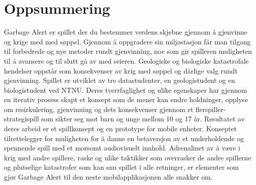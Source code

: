 \section{Oppsummering}
Garbage Alert er spillet der du bestemmer verdens skjebne gjennom å gjenvinne og krige med med søppel. Gjennom å oppgradere sin miljøstasjon får man tilgang til forbedrede og nye metoder rundt gjenvinning, noe som gir spilleren muligheten til å avansere og til slutt gå av med seieren.  Geologiske og biologiske katastrofale hendelser oppstår som konsekvenser av krig med søppel og dårlige valg rundt gjenvinning. 
Spillet er utviklet av tre datastudenter, en geologistudent og en biologistudent ved NTNU. Deres tverrfaglighet og ulike egenskaper har gjennom en iterativ prosess skapt et konsept som de mener kan endre holdninger, opplyse om resirkulering, gjenvinning og dets konsekvenser gjennom et flerspiller-strategispill som sikter seg mot barn og unge mellom 10 og 17 år. 
Resultatet av deres arbeid er et spillkonsept og en prototype for mobile enheter. Konseptet tilrettelegger for muligheten for å danne en betaversjon av et underholdende og spennende spill med et morsomt audiovisuelt innhold. Adrenalinet av å være i krig med andre spillere, raske og ulike taktikker som overrasker de andre spillerne og plutselige katastrofer som kan snu spillet i alle retninger, er elementer som gjør Garbage Alert til den neste mobilapplikasjonen alle snakker om. 

